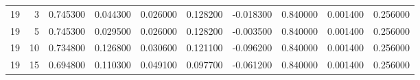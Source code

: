 \begin{table}
\begin{tabular}{rrrrrrrrrr}
19 & 3 & 0.745300 & 0.044300 & 0.026000 & 0.128200 & -0.018300 & 0.840000 & 0.001400 & 0.256000 \\
19 & 5 & 0.745300 & 0.029500 & 0.026000 & 0.128200 & -0.003500 & 0.840000 & 0.001400 & 0.256000 \\
19 & 10 & 0.734800 & 0.126800 & 0.030600 & 0.121100 & -0.096200 & 0.840000 & 0.001400 & 0.256000 \\
19 & 15 & 0.694800 & 0.110300 & 0.049100 & 0.097700 & -0.061200 & 0.840000 & 0.001400 & 0.256000 \\
\bottomrule
\end{tabular}
\end{table}
